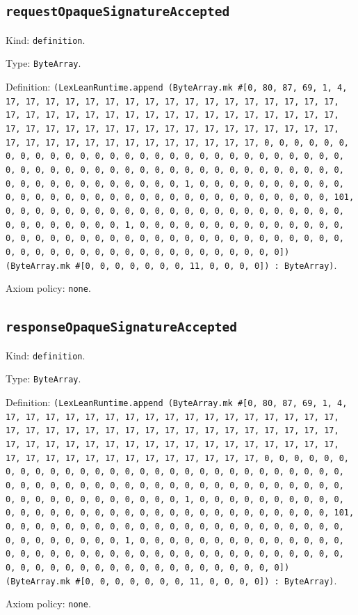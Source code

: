 \documentclass[11pt]{article}
\begin{document}
\subsection*{\texttt{requestOpaqueSignatureAccepted}}
\noindent Kind: \texttt{definition}.\par
\noindent Type: \texttt{ByteArray}.\par
\noindent Definition: \texttt{(LexLeanRuntime.append (ByteArray.mk \#[0, 80, 87, 69, 1, 4, 17, 17, 17, 17, 17, 17, 17, 17, 17, 17, 17, 17, 17, 17, 17, 17, 17, 17, 17, 17, 17, 17, 17, 17, 17, 17, 17, 17, 17, 17, 17, 17, 17, 17, 17, 17, 17, 17, 17, 17, 17, 17, 17, 17, 17, 17, 17, 17, 17, 17, 17, 17, 17, 17, 17, 17, 17, 17, 17, 17, 17, 17, 17, 17, 0, 0, 0, 0, 0, 0, 0, 0, 0, 0, 0, 0, 0, 0, 0, 0, 0, 0, 0, 0, 0, 0, 0, 0, 0, 0, 0, 0, 0, 0, 0, 0, 0, 0, 0, 0, 0, 0, 0, 0, 0, 0, 0, 0, 0, 0, 0, 0, 0, 0, 0, 0, 0, 0, 0, 0, 0, 0, 0, 0, 0, 0, 0, 0, 1, 0, 0, 0, 0, 0, 0, 0, 0, 0, 0, 0, 0, 0, 0, 0, 0, 0, 0, 0, 0, 0, 0, 0, 0, 0, 0, 0, 0, 0, 0, 0, 0, 101, 0, 0, 0, 0, 0, 0, 0, 0, 0, 0, 0, 0, 0, 0, 0, 0, 0, 0, 0, 0, 0, 0, 0, 0, 0, 0, 0, 0, 0, 0, 0, 1, 0, 0, 0, 0, 0, 0, 0, 0, 0, 0, 0, 0, 0, 0, 0, 0, 0, 0, 0, 0, 0, 0, 0, 0, 0, 0, 0, 0, 0, 0, 0, 0, 0, 0, 0, 0, 0, 0, 0, 0, 0, 0, 0, 0, 0, 0, 0, 0, 0, 0, 0, 0, 0, 0, 0, 0]) (ByteArray.mk \#[0, 0, 0, 0, 0, 0, 0, 11, 0, 0, 0, 0]) : ByteArray)}.\par
\noindent Axiom policy: \texttt{none}.\par
\subsection*{\texttt{responseOpaqueSignatureAccepted}}
\noindent Kind: \texttt{definition}.\par
\noindent Type: \texttt{ByteArray}.\par
\noindent Definition: \texttt{(LexLeanRuntime.append (ByteArray.mk \#[0, 80, 87, 69, 1, 4, 17, 17, 17, 17, 17, 17, 17, 17, 17, 17, 17, 17, 17, 17, 17, 17, 17, 17, 17, 17, 17, 17, 17, 17, 17, 17, 17, 17, 17, 17, 17, 17, 17, 17, 17, 17, 17, 17, 17, 17, 17, 17, 17, 17, 17, 17, 17, 17, 17, 17, 17, 17, 17, 17, 17, 17, 17, 17, 17, 17, 17, 17, 17, 17, 0, 0, 0, 0, 0, 0, 0, 0, 0, 0, 0, 0, 0, 0, 0, 0, 0, 0, 0, 0, 0, 0, 0, 0, 0, 0, 0, 0, 0, 0, 0, 0, 0, 0, 0, 0, 0, 0, 0, 0, 0, 0, 0, 0, 0, 0, 0, 0, 0, 0, 0, 0, 0, 0, 0, 0, 0, 0, 0, 0, 0, 0, 0, 0, 1, 0, 0, 0, 0, 0, 0, 0, 0, 0, 0, 0, 0, 0, 0, 0, 0, 0, 0, 0, 0, 0, 0, 0, 0, 0, 0, 0, 0, 0, 0, 0, 0, 101, 0, 0, 0, 0, 0, 0, 0, 0, 0, 0, 0, 0, 0, 0, 0, 0, 0, 0, 0, 0, 0, 0, 0, 0, 0, 0, 0, 0, 0, 0, 0, 1, 0, 0, 0, 0, 0, 0, 0, 0, 0, 0, 0, 0, 0, 0, 0, 0, 0, 0, 0, 0, 0, 0, 0, 0, 0, 0, 0, 0, 0, 0, 0, 0, 0, 0, 0, 0, 0, 0, 0, 0, 0, 0, 0, 0, 0, 0, 0, 0, 0, 0, 0, 0, 0, 0, 0, 0]) (ByteArray.mk \#[0, 0, 0, 0, 0, 0, 0, 11, 0, 0, 0, 0]) : ByteArray)}.\par
\noindent Axiom policy: \texttt{none}.\par
\end{document}
